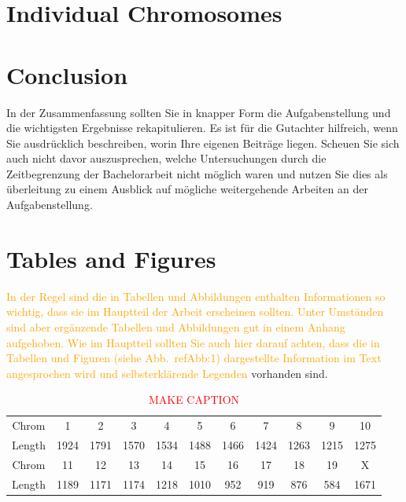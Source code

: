 \documentclass[a4paper,11pt,oneside,final,english,toc=bib,draft]{scrbook}
\begin{document}

\chapter{Individual Chromosomes} %
\label{cha:individual_chromosomes}


\chapter{Conclusion} %
\label{cha:conclusion}

In der Zusammenfassung sollten Sie in knapper Form die Aufgabenstellung 
und die wichtigsten Ergebnisse rekapitulieren. Es ist für die 
Gutachter hilfreich, wenn Sie ausdrücklich beschreiben, worin 
Ihre eigenen Beiträge liegen. Scheuen Sie sich auch nicht davor 
auszusprechen, welche Untersuchungen durch die Zeitbegrenzung der 
Bachelorarbeit nicht möglich waren und nutzen Sie dies als 
überleitung zu einem Ausblick auf mögliche weitergehende 
Arbeiten an der Aufgabenstellung.


\appendix

\chapter{Tables and Figures} %
\label{cha:tables_and_figures}

\textcolor{orange}{In der Regel sind die in Tabellen und Abbildungen enthalten Informationen 
so wichtig, dass sie im Hauptteil der Arbeit erscheinen sollten. Unter 
Umständen sind aber ergänzende Tabellen und Abbildungen gut in einem 
Anhang aufgehoben. Wie im Hauptteil sollten Sie auch hier darauf achten, 
dass die in Tabellen und Figuren (siehe Abb.\ ref{Abb:1}) dargestellte 
Information im Text angesprochen wird und selbsterklärende Legenden}
vorhanden sind.

\medskip

\begin{table}[H]
\centering
  \caption{\textcolor{red}{MAKE CAPTION}}
  \label{tab:chrom_lengths}
  \begin{tabular}{c c c c c c c c c c c}
   \toprule
    Chrom & 1 & 2 & 3 & 4 & 5 & 6 & 7 & 8 & 9 & 10 \\
    Length & 1924 & 1791 & 1570 & 1534 & 1488 & 1466 & 1424 & 1263 & 1215 & 1275 \\
  \midrule
    Chrom & 11 & 12 & 13 & 14 & 15 & 16 & 17 & 18 & 19 & X \\
    Length & 1189 & 1171 & 1174 & 1218 & 1010 & 952 & 919 & 876 & 584 & 1671 \\
  \bottomrule
  \end{tabular}
\end{table}
\end{document}
